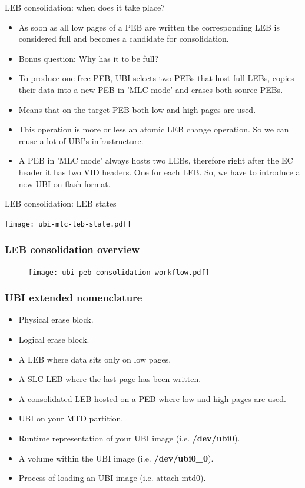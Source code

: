 \documentclass[aspectratio=169,obeyspaces,spaces,hyphens,dvipsnames]{beamer}
\begin{document}
\begin{frame}{LEB consolidation: when does it take place?}
  \begin{itemize}
  \item As soon as all low pages of a PEB are written the corresponding LEB is
	considered full and becomes a candidate for consolidation.
  \item Bonus question: Why has it to be full?
  \item To produce one free PEB, UBI selects two PEBs that host full LEBs,
	copies their data into a new PEB in 'MLC mode' and erases both source
	PEBs.
  \item Means that on the target PEB both low and high pages are used.
  \item This operation is more or less an atomic LEB change operation. So we
	can reuse a lot of  UBI's infrastructure.
  \item A PEB in 'MLC mode' always hosts two LEBs, therefore right after the
	EC header it has two VID headers. One for each LEB. So, we have to
	introduce a new UBI on-flash format.
  \end{itemize}
\end{frame}

\begin{frame}{LEB consolidation: LEB states}
  \begin{center}
    \texttt{[image: ubi-mlc-leb-state.pdf]}
  \end{center}
\end{frame}

\begin{frame}[fragile]
\frametitle{LEB consolidation overview}
     \begin{figure}
     \texttt{[image: ubi-peb-consolidation-workflow.pdf]}
     \end{figure}
\end{frame}

\begin{frame}[fragile]
\frametitle{UBI extended nomenclature}
  \begin{itemize}
  \item[PEB] Physical erase block.
  \item[LEB] Logical erase block.
  \item[SLC LEB] A LEB where data sits only on low pages.
  \item[Full LEB] A SLC LEB where the last page has been written.
  \item[CLEB] A consolidated LEB hosted on a PEB where low and high pages are used.
  \item[Image] UBI on your MTD partition.
  \item[Device] Runtime representation of your UBI image (i.e. \textbf{/dev/ubi0}).
  \item[Volume] A volume within the UBI image (i.e. \textbf{/dev/ubi0\_0}).
  \item[Attach] Process of loading an UBI image (i.e. attach mtd0).
  \end{itemize}
\end{frame}
\end{document}
